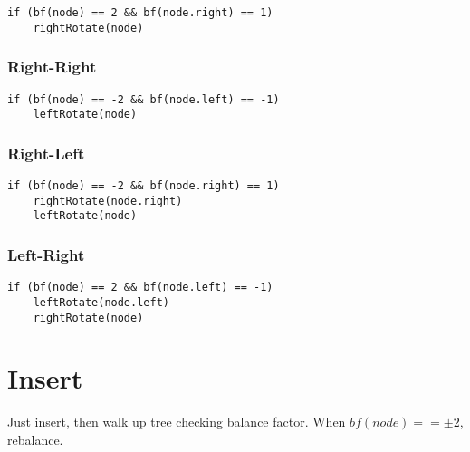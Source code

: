 \documentclass[12pt]{article}
\begin{document}
\begin{spacing}{1.5}
\begin{verbatim}
if (bf(node) == 2 && bf(node.right) == 1) 
    rightRotate(node) 
\end{verbatim}

\subsubsection{Right-Right}

\begin{verbatim}
if (bf(node) == -2 && bf(node.left) == -1) 
    leftRotate(node) 
\end{verbatim}

\subsubsection{Right-Left}

\begin{verbatim}
if (bf(node) == -2 && bf(node.right) == 1) 
    rightRotate(node.right)
    leftRotate(node) 
\end{verbatim}

\subsubsection{Left-Right}

\begin{verbatim}
if (bf(node) == 2 && bf(node.left) == -1) 
    leftRotate(node.left)
    rightRotate(node) 
\end{verbatim}

\section{Insert}

Just insert, then walk up tree checking balance factor. When $bf(node) == \pm 2$, rebalance. 

\end{spacing}
\end{document}
